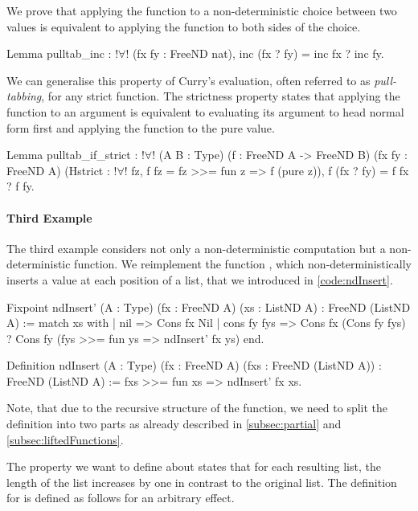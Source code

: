 We prove that applying the function  to a non\--deterministic choice between two values is equivalent to applying the function to both sides of the choice.

\begin{coqcode}
Lemma pulltab_inc : !$\forall$! (fx fy : FreeND nat),
  inc (fx ? fy) = inc fx ? inc fy.
\end{coqcode}

We can generalise this property of Curry's evaluation, often referred to as \emph{pull\--tabbing}, for any strict function.
The strictness property states that applying the function to an argument is equivalent to evaluating its argument to head normal form first and applying the function to the pure value.

\begin{coqcode}
Lemma pulltab_if_strict : !$\forall$! (A B : Type)
  (f : FreeND A -> FreeND B) (fx fy : FreeND A)
  (Hstrict : !$\forall$! fz, f fz = fz >>= fun z => f (pure z)),
   f (fx ? fy) = f fx ? f fy.
\end{coqcode}

\paragraph{Third Example}
The third example considers not only a non\--deterministic computation but a non\--deterministic function.
We reimplement the function , which non\--deterministically inserts a value at each position of a list, that we introduced in \autoref{code:ndInsert}.

\begin{coqcode}
Fixpoint ndInsert' (A : Type) (fx : FreeND A) (xs : ListND A)
 : FreeND (ListND A) :=
 match xs with
 | nil         => Cons fx Nil
 | cons fy fys => Cons fx (Cons fy fys)
                ? Cons fy (fys >>= fun ys => ndInsert' fx ys)
 end.

Definition ndInsert (A : Type) (fx : FreeND A) (fxs : FreeND (ListND A))
 : FreeND (ListND A) :=
 fxs >>= fun xs => ndInsert' fx xs.
\end{coqcode}

Note, that due to the recursive structure of the function, we need to split the definition into two parts as already described in \autoref{subsec:partial} and \autoref{subsec:liftedFunctions}.

The property we want to define about  states that for each resulting list, the length of the list increases by one in contrast to the original list.
The definition for  is defined as follows for an arbitrary effect.

